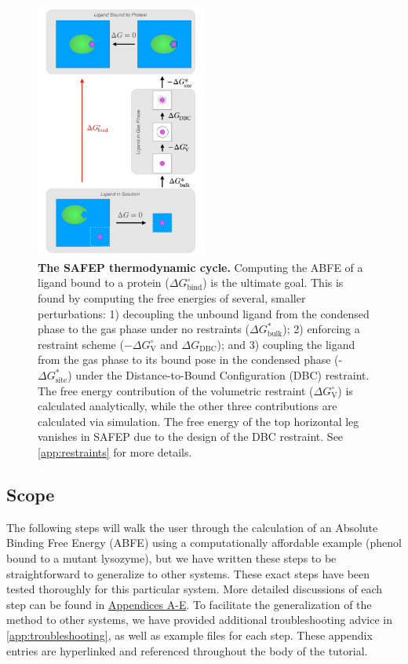 \documentclass[9pt,tutorial]{Styling/livecoms}
\begin{document}
\begin{figure}[!ht]
    \centering
    \includegraphics[width=0.5\textwidth]{SAFEP_cycle.pdf}
    \caption{\textbf{The SAFEP thermodynamic cycle.} 
    Computing the ABFE of a ligand bound to a protein ($\Delta G^\circ_\mathrm{bind}$) is the ultimate goal. 
    This is found by computing the free energies of several, smaller perturbations: 1) decoupling the unbound ligand from the condensed phase to the gas phase under no restraints ($\Delta G^*_{\mathrm{bulk}}$); 2) enforcing a restraint scheme ($-\Delta G^\circ_\mathrm{V}$ and $\Delta G_\mathrm{DBC}$); and 3) coupling the ligand from the gas phase to its bound pose in the condensed phase (-$\Delta G^*_{\mathrm{site}}$) under the Distance-to-Bound Configuration (DBC) restraint.
    The free energy contribution of the volumetric restraint ($\Delta G^\circ_\mathrm{V}$) is calculated analytically, while the other three contributions are calculated via simulation. The free energy of the top horizontal leg vanishes in SAFEP due to the design of the DBC restraint. See \ref{app:restraints} for more details.}
    \label{fig:cycle}
\end{figure}

\subsection{Scope}
The following steps will walk the user through the calculation of an Absolute Binding Free Energy (ABFE) using a computationally affordable example (phenol bound to a mutant lysozyme), but we have written these steps to be straightforward to generalize to other systems.
These exact steps have been tested thoroughly for this particular system.
More detailed discussions of each step can be found in \hyperref[app:motivation]{Appendices A-E}. To facilitate the generalization of the method to other systems, we have provided additional troubleshooting advice in \ref{app:troubleshooting}, as well as example files for each step.
These appendix entries are hyperlinked and referenced throughout the body of the tutorial.
\end{document}
